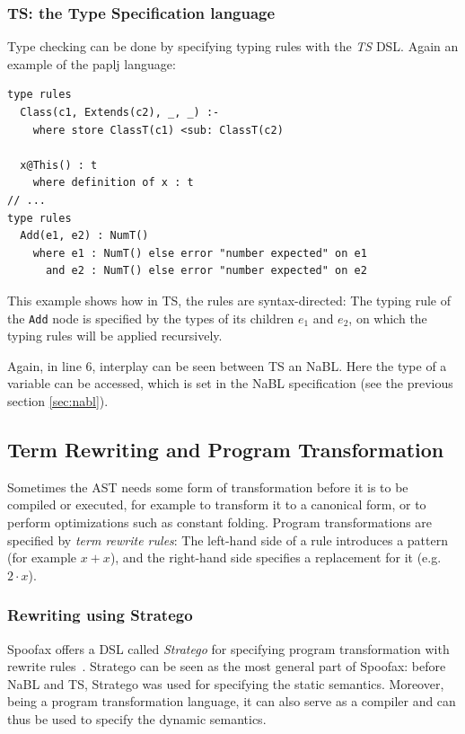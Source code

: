 \subsubsection{TS: the Type Specification language}
\label{sec:orgheadline4}
Type checking can be done by specifying typing rules with the \emph{TS}
DSL. Again an example of the paplj language:
\lstset{language=type-spec,numbers=left}
\begin{lstlisting}
type rules
  Class(c1, Extends(c2), _, _) :-
    where store ClassT(c1) <sub: ClassT(c2)

  x@This() : t
    where definition of x : t
// ...
type rules
  Add(e1, e2) : NumT()
    where e1 : NumT() else error "number expected" on e1
      and e2 : NumT() else error "number expected" on e2
\end{lstlisting}
This example shows how in TS, the rules are syntax-directed: The
typing rule of the \texttt{Add} node is specified by the types of its
children \(e_1\) and \(e_2\), on which the typing rules will be applied
recursively.

Again, in line 6, interplay can be seen between TS an NaBL. Here the
type of a variable can be accessed, which is set in the NaBL
specification (see the previous section \ref{sec:nabl}).
\subsection{Term Rewriting and Program Transformation}
\label{sec:term-rewrite}
Sometimes the AST needs some form of transformation before it is to be
compiled or executed, for example to transform it to a canonical form,
or to perform optimizations such as constant folding. Program
transformations are specified by \emph{term rewrite rules}: The left-hand
side of a rule introduces a pattern (for example \(x + x\)), and the
right-hand side specifies a replacement for it (e.g. \(2\cdot x\)).
\subsubsection{Rewriting using Stratego}
\label{sec:orgheadline5}
Spoofax offers a DSL called \emph{Stratego} for specifying program
transformation with rewrite rules~\cite{Visser01}. Stratego can be
seen as the most general part of Spoofax: before NaBL and TS, Stratego
was used for specifying the static semantics. Moreover, being a
program transformation language, it can also serve as a compiler and
can thus be used to specify the dynamic semantics.


